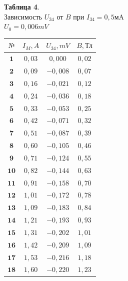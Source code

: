 \documentclass[11pt,a4paper]{article}
\begin{document}
\newpage
\begin{paracol}{2}
	\begin{table}[h!]
	\begin{center}
		\textbf{Таблица 4}. \\ Зависимость $U_{34}$ от $B$ при $I_{34} = 0,5 \text{мA}$\\
		$U_0 = 0,006 mV$
		\\
		\begin{tabular}{|c|c|c|c|}
			\hline
			$\text{№}$  & $I_M,A$ & $U_{34},mV$ & $B,\text{Тл}$ \\ \hline
			$\textbf{1}$ & $0,03$ & $0,000$  & $0,02$ \\ \hline
			$\textbf{2}$ & $0,09$ & $-0,008$  & $0,07$ \\ \hline
			$\textbf{3}$ & $0,16$ & $-0,021$  & $0,12$ \\ \hline
			$\textbf{4}$ & $0,24$ & $-0,036$  & $0,18$ \\ \hline
			$\textbf{5}$ & $0,33$ & $-0,053$  & $0,25$ \\ \hline
			$\textbf{6}$ & $0,42$ & $-0,071$  & $0,32$ \\ \hline
			$\textbf{7}$ & $0,51$ & $-0,087$  & $0,39$ \\ \hline
			$\textbf{8}$ & $0,60$ & $-0,105$  & $0,46$ \\ \hline
			$\textbf{9}$ & $0,71$ & $-0,124$  & $0,55$ \\ \hline
			$\textbf{10}$ & $0,82$ & $-0,144$  & $0,63$ \\ \hline
			$\textbf{11}$ & $0,91$ & $-0,158$  & $0,70$ \\ \hline
			$\textbf{12}$ & $1,01$ & $-0,172$  & $0,78$ \\ \hline
			$\textbf{13}$ & $1,09$ & $-0,183$  & $0,84$ \\ \hline
			$\textbf{14}$ & $1,21$ & $-0,193$  & $0,93$ \\ \hline
			$\textbf{15}$ & $1,31$ & $-0,202$  & $1,01$ \\ \hline
			$\textbf{16}$ & $1,42$ & $-0,209$  & $1,09$ \\ \hline
			$\textbf{17}$ & $1,53$ & $-0,216$  & $1,18$ \\ \hline
			$\textbf{18}$ & $1,60$ & $-0,220$  & $1,23$ \\ \hline
		\end{tabular}
	\end{center}
\end{table}
\switchcolumn
\begin{table}[t!] 
\begin{center} 

\end{center}
\end{table}
\end{paracol}
\end{document}
